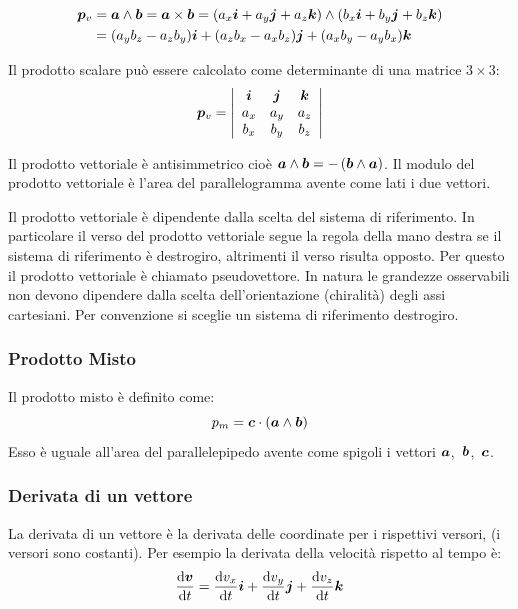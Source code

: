 \begin{align*}
  \boldsymbol{p}_v & =\boldsymbol{a} \wedge \boldsymbol{b}=\boldsymbol{a} \times \boldsymbol{b}=(a_x\boldsymbol{i}+a_y\boldsymbol{j}+a_z\boldsymbol{k})\wedge(b_x\boldsymbol{i}+b_y\boldsymbol{j}+b_z\boldsymbol{k})                                                                       \\
          & =(a_yb_z-a_zb_y)\boldsymbol{i}+(a_zb_x-a_xb_z)\boldsymbol{j}+(a_xb_y-a_yb_x)\boldsymbol{k}
\end{align*}

Il prodotto scalare può essere calcolato come determinante di una matrice $3\times 3$:
\[\boldsymbol{p}_v=
  \left| \begin{array}{ccc} \boldsymbol{i} & \boldsymbol{j} & \boldsymbol{k} \\
             a_x         & a_y   & a_z   \\
             b_x         & b_y   & b_z
  \end{array} \right|\]

Il prodotto vettoriale è antisimmetrico cioè $\boldsymbol{a} \wedge \boldsymbol{b}=-\left(\boldsymbol{b} \wedge \boldsymbol{a}\right)$. Il modulo del prodotto
vettoriale è l'area del parallelogramma avente come lati i due
vettori.

Il prodotto vettoriale è dipendente dalla scelta del sistema di riferimento. In particolare il verso del prodotto vettoriale segue la regola della mano destra se il sistema di riferimento è destrogiro, altrimenti il verso risulta opposto. Per questo il prodotto vettoriale è chiamato pseudovettore. In natura le grandezze osservabili non devono dipendere dalla scelta dell'orientazione (chiralità) degli assi cartesiani. Per convenzione si sceglie un sistema di riferimento destrogiro.
\begin{figure}[htbp]
  \centering
  \subfigure[destrogiro]{}
  \subfigure[sinistrogiro]{}
\end{figure}

\subsubsection{Prodotto Misto}
Il prodotto misto è definito come:
\[p_m=\boldsymbol{c}\cdot\left(\boldsymbol{a} \wedge \boldsymbol{b}\right)\]
Esso è uguale all'area del parallelepipedo avente come spigoli i
vettori \mbox{$\boldsymbol{a}$, $\boldsymbol{b}$, $\boldsymbol{c}$.}

\subsubsection{Derivata di un vettore}
La derivata di un vettore è la derivata delle coordinate per i rispettivi versori, (i versori sono costanti). Per esempio la derivata della velocità rispetto al tempo è:
\[\frac{\mathrm{d}\boldsymbol{v}}{\mathrm{d} t}=\frac{\mathrm{d} v_x}{\mathrm{d} t}\boldsymbol{i}+\frac{\mathrm{d} v_y}{\mathrm{d} t}\boldsymbol{j}+\frac{\mathrm{d} v_z}{\mathrm{d} t}\boldsymbol{k}\]

